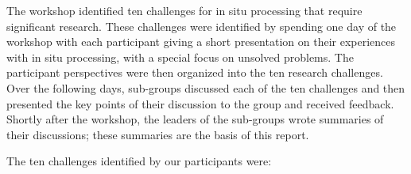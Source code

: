 

\noindent
The workshop identified ten challenges for in situ processing that require significant research.
%
These challenges were identified by spending one day of the workshop with each participant giving a short
presentation on their experiences with in situ processing, with a special focus on unsolved problems.
%
The participant perspectives were then organized into the ten research challenges.
%
Over the following days, 
 sub-groups  discussed each of the ten challenges and then presented the key points of their discussion to the group and received feedback.
%
Shortly after the workshop, the leaders of the sub-groups wrote summaries of their discussions; these summaries are the basis of this report.

\medskip\noindent
The ten challenges identified by our participants were:


